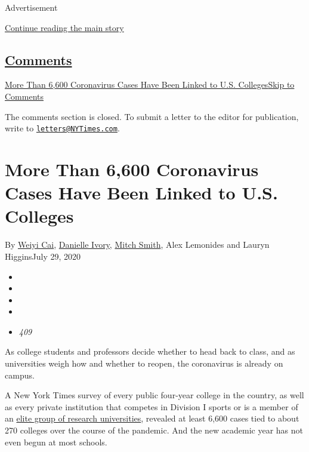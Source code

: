 Advertisement

\protect\hyperlink{after-top}{Continue reading the main story}

\hypertarget{comments}{%
\subsection{\texorpdfstring{\protect\hyperlink{commentsContainer}{Comments}}{Comments}}\label{comments}}

\href{}{More Than 6,600 Coronavirus Cases Have Been Linked to U.S.
Colleges}\href{}{Skip to Comments}

The comments section is closed. To submit a letter to the editor for
publication, write to
\href{mailto:letters@NYTimes.com}{\nolinkurl{letters@NYTimes.com}}.

\hypertarget{more-than-6600-coronavirus-cases-have-been-linked-to-us-colleges}{%
\section{More Than 6,600 Coronavirus Cases Have Been Linked to U.S.
Colleges}\label{more-than-6600-coronavirus-cases-have-been-linked-to-us-colleges}}

By \href{https://www.nytimes3xbfgragh.onion/by/weiyi-cai}{Weiyi Cai},
\href{https://www.nytimes3xbfgragh.onion/by/danielle-ivory}{Danielle
Ivory}, \href{https://www.nytimes3xbfgragh.onion/by/mitch-smith}{Mitch
Smith}, Alex Lemonides and Lauryn HigginsJuly 29, 2020

\begin{itemize}
\item
\item
\item
\item
\item
  \emph{409}
\end{itemize}

As college students and professors decide whether to head back to class,
and as universities weigh how and whether to reopen, the coronavirus is
already on campus.

A New York Times survey of every public four-year college in the
country, as well as every private institution that competes in Division
I sports or is a member of an
\href{https://www.aau.edu/sites/default/files/AAU-Files/Who-We-Are/AAU-Member-List.pdf}{elite
group of research universities}, revealed at least 6,600 cases tied to
about 270 colleges over the course of the pandemic. And the new academic
year has not even begun at most schools.

